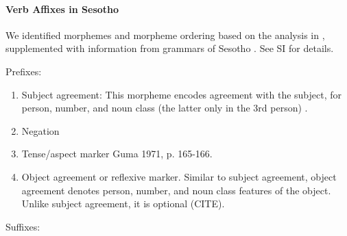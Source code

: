 \paragraph{Verb Affixes in Sesotho}

We identified morphemes and morpheme ordering based on the analysis in \cite{demuth1992acquisition}, supplemented with information from grammars of Sesotho \citep{doke1967textbook,guma1971outline}. See SI for details.

Prefixes:

\begin{enumerate}
    \item Subject agreement: This morpheme encodes agreement with the subject, for person, number, and noun class (the latter only in the 3rd person) \cite[]{doke1967textbook}.
    
    \item Negation 
    
    \item Tense/aspect marker  Guma 1971, p. 165-166. \cite[-424]{doke1967textbook}
    
    \item Object agreement or reflexive marker. 
    Similar to subject agreement, object agreement denotes person, number, and noun class features of the object.
    Unlike subject agreement, it is optional (CITE).
    \end{enumerate}
    
    Suffixes:
    

